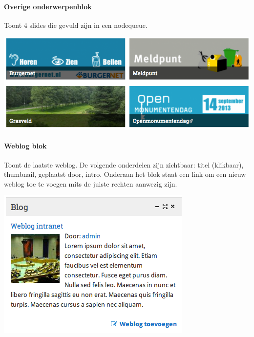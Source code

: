 \paragraph{Overige onderwerpenblok}

Toont 4 slides die gevuld zijn in een nodequeue.

\begin{center}
	\includegraphics[scale=0.5]{img/blokken/onderwerpen.png}
\end{center}

\paragraph{Weblog blok}

Toont de laatste weblog. De volgende onderdelen zijn zichtbaar: titel (klikbaar), thumbnail, geplaatst door, intro. Onderaan het blok staat een link om een nieuw weblog toe te voegen mits de juiste rechten aanwezig zijn.

\begin{center}
	\includegraphics[scale=0.5]{img/blokken/blog.png}
\end{center}